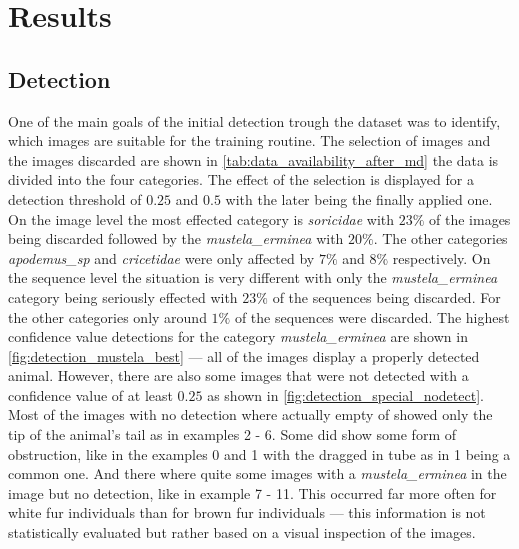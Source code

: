 

\section{Results}
\label{results}

    \subsection{Detection}
    One of the main goals of the initial detection trough the dataset was to identify, which images are suitable for the training routine.
    The selection of images and the images discarded are shown in \autoref{tab:data_availability_after_md} the data is divided into the four categories.
    The effect of the selection is displayed for a detection threshold of \(0.25\) and \(0.5\) with the later being the finally applied one.
    On the image level the most effected category is \textit{soricidae} with \(23\%\) of the images being discarded followed by the \textit{mustela\_erminea} with \(20\%\).
    The other categories \textit{apodemus\_sp} and \textit{cricetidae} were only affected by \(7\%\) and \(8\%\) respectively.
    On the sequence level the situation is very different with only the \textit{mustela\_erminea} category being seriously effected with \(23\%\) of the sequences being discarded.
    For the other categories only around \(1\%\) of the sequences were discarded.
    The highest confidence value detections for the category \textit{mustela\_erminea} are shown in \autoref{fig:detection_mustela_best} --- all of the images display a properly detected animal.
    However, there are also some images that were not detected with a confidence value of at least \(0.25\) as shown in \autoref{fig:detection_special_nodetect}.
    Most of the images with no detection where actually empty of showed only the tip of the animal's tail as in examples 2 - 6.
    Some did show some form of obstruction, like in the examples 0 and 1 with the dragged in tube as in 1 being a common one.
    And there where quite some images with a \textit{mustela\_erminea} in the image but no detection, like in example 7 - 11.
    This occurred far more often for white fur individuals than for brown fur individuals --- this information is not statistically evaluated but rather based on a visual inspection of the images.

